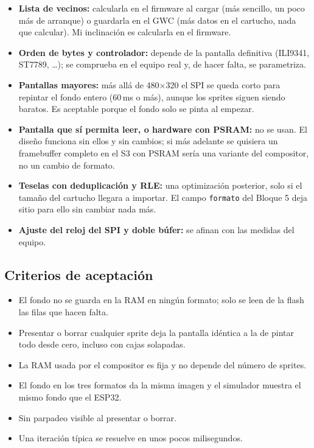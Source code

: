 \begin{itemize}
	\item \textbf{Lista de vecinos:} calcularla en el firmware al cargar (más sencillo, un poco más de arranque) o guardarla en el GWC (más datos en el cartucho, nada que calcular). Mi inclinación es calcularla en el firmware.
	\item \textbf{Orden de bytes y controlador:} depende de la pantalla definitiva (ILI9341, ST7789, \ldots); se comprueba en el equipo real y, de hacer falta, se parametriza.
	\item \textbf{Pantallas mayores:} más allá de 480$\times$320 el SPI se queda corto para repintar el fondo entero (60\,ms o más), aunque los sprites siguen siendo baratos. Es aceptable porque el fondo solo se pinta al empezar.
	\item \textbf{Pantalla que sí permita leer, o hardware con PSRAM:} no se usan. El diseño funciona sin ellos y sin cambios; si más adelante se quisiera un framebuffer completo en el S3 con PSRAM sería una variante del compositor, no un cambio de formato.
	\item \textbf{Teselas con deduplicación y RLE:} una optimización posterior, solo si el tamaño del cartucho llegara a importar. El campo \texttt{formato} del Bloque 5 deja sitio para ello sin cambiar nada más.
	\item \textbf{Ajuste del reloj del SPI y doble búfer:} se afinan con las medidas del equipo.
\end{itemize}

\subsection{Criterios de aceptación}
\label{sec:F6I91Criterios}

\begin{itemize}
	\item El fondo no se guarda en la RAM en ningún formato; solo se leen de la flash las filas que hacen falta.
	\item Presentar o borrar cualquier sprite deja la pantalla idéntica a la de pintar todo desde cero, incluso con cajas solapadas.
	\item La RAM usada por el compositor es fija y no depende del número de sprites.
	\item El fondo en los tres formatos da la misma imagen y el simulador muestra el mismo fondo que el ESP32.
	\item Sin parpadeo visible al presentar o borrar.
	\item Una iteración típica se resuelve en unos pocos milisegundos.
\end{itemize}
